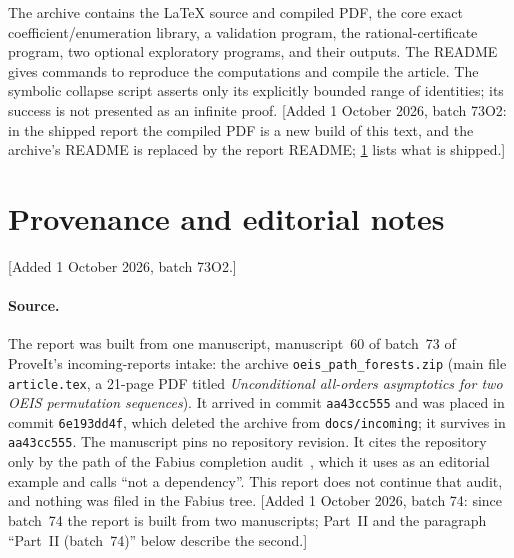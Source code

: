 \documentclass[11pt]{article}
\numberwithin{equation}{section}
\theoremstyle{definition}
\theoremstyle{remark}
\theoremstyle{definition}
\begin{document}
The archive contains the \LaTeX{} source and compiled PDF, the core exact
coefficient/enumeration library, a validation program, the rational-certificate
program, two optional exploratory programs, and their outputs. The README gives
commands to reproduce the computations and compile the article. The symbolic
collapse script asserts only its explicitly bounded range of identities; its
success is not presented as an infinite proof.
[Added 1 October 2026, batch 73O2: in the shipped report the compiled PDF is
a new build of this text, and the archive's README is replaced by the report
README; \cref{spf:app:provenance} lists what is shipped.]

\section{Provenance and editorial notes}
\label{spf:app:provenance}

[Added 1 October 2026, batch 73O2.]

\paragraph{Source.}
The report was built from one manuscript, manuscript~60 of batch~73 of
ProveIt's incoming-reports intake: the archive \texttt{oeis\_path\_forests.zip}
(main file \texttt{article.tex}, a 21-page PDF titled \emph{Unconditional
all-orders asymptotics for two OEIS permutation sequences}). It arrived in
commit \texttt{aa43cc555} and was placed in commit \texttt{6e193dd4f}, which
deleted the archive from \texttt{docs/incoming}; it survives in
\texttt{aa43cc555}. The manuscript pins no repository revision. It cites the
repository only by the path of the Fabius completion audit~\cite{proveit},
which it uses as an editorial example and calls ``not a dependency''. This
report does not continue that audit, and nothing was filed in the Fabius tree.
[Added 1 October 2026, batch 74: since batch~74 the report is built from
two manuscripts; Part~II and the paragraph ``Part~II (batch~74)'' below
describe the second.]
\end{document}
